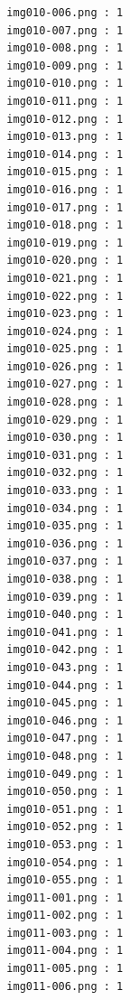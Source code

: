 \documentclass[12pt,a4paper]{article}
\begin{document}
\begin{lstlisting}
                     img010-006.png : 1
                     img010-007.png : 1
                     img010-008.png : 1
                     img010-009.png : 1
                     img010-010.png : 1
                     img010-011.png : 1
                     img010-012.png : 1
                     img010-013.png : 1
                     img010-014.png : 1
                     img010-015.png : 1
                     img010-016.png : 1
                     img010-017.png : 1
                     img010-018.png : 1
                     img010-019.png : 1
                     img010-020.png : 1
                     img010-021.png : 1
                     img010-022.png : 1
                     img010-023.png : 1
                     img010-024.png : 1
                     img010-025.png : 1
                     img010-026.png : 1
                     img010-027.png : 1
                     img010-028.png : 1
                     img010-029.png : 1
                     img010-030.png : 1
                     img010-031.png : 1
                     img010-032.png : 1
                     img010-033.png : 1
                     img010-034.png : 1
                     img010-035.png : 1
                     img010-036.png : 1
                     img010-037.png : 1
                     img010-038.png : 1
                     img010-039.png : 1
                     img010-040.png : 1
                     img010-041.png : 1
                     img010-042.png : 1
                     img010-043.png : 1
                     img010-044.png : 1
                     img010-045.png : 1
                     img010-046.png : 1
                     img010-047.png : 1
                     img010-048.png : 1
                     img010-049.png : 1
                     img010-050.png : 1
                     img010-051.png : 1
                     img010-052.png : 1
                     img010-053.png : 1
                     img010-054.png : 1
                     img010-055.png : 1
                     img011-001.png : 1
                     img011-002.png : 1
                     img011-003.png : 1
                     img011-004.png : 1
                     img011-005.png : 1
                     img011-006.png : 1




\end{lstlisting}
\end{document}
